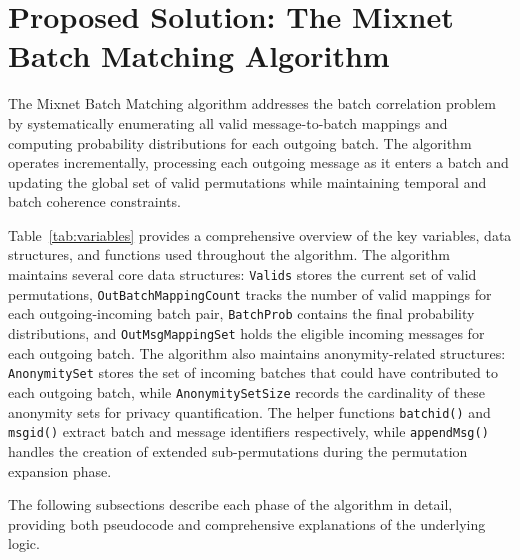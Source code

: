 \documentclass{article}
\begin{document}
\section{Proposed Solution: The Mixnet Batch Matching Algorithm}
\label{sec:solution}

The Mixnet Batch Matching algorithm addresses the batch 
correlation problem by systematically enumerating 
all valid message-to-batch mappings and computing 
probability distributions for each outgoing batch. 
The algorithm operates incrementally, processing 
each outgoing message as it enters a batch and 
updating the global set of valid permutations 
while maintaining temporal and batch coherence 
constraints.

Table~\ref{tab:variables} provides a comprehensive 
overview of the key variables, data structures, 
and functions used throughout the algorithm. 
The algorithm maintains several core data 
structures: \texttt{Valids} stores the current 
set of valid permutations, \texttt{OutBatchMappingCount} 
tracks the number of valid mappings for each 
outgoing-incoming batch pair, \texttt{BatchProb} 
contains the final probability distributions, 
and \texttt{OutMsgMappingSet} holds the eligible 
incoming messages for each outgoing batch. The algorithm 
also maintains anonymity-related structures: 
\texttt{AnonymitySet} stores the set of incoming batches 
that could have contributed to each outgoing batch, 
while \texttt{AnonymitySetSize} records the cardinality 
of these anonymity sets for privacy quantification. 
The helper functions \texttt{batchid()} and \texttt{msgid()} 
extract batch and message identifiers respectively, 
while \texttt{appendMsg()} handles the creation of 
extended sub-permutations during the permutation 
expansion phase.

The following subsections describe each phase of the algorithm in detail, providing both pseudocode and comprehensive explanations of the underlying logic.
\end{document}
